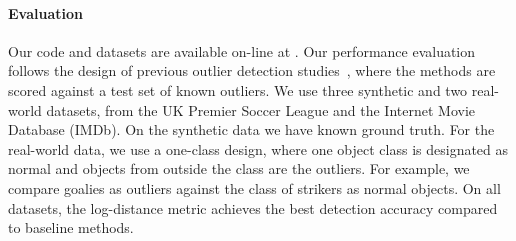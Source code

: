 \documentclass[conference]{IEEEtran}
\begin{document}
%
%
\paragraph{Evaluation} Our code and datasets are available on-line at \cite{url}.
Our performance evaluation follows the design of previous outlier detection studies~\cite{Gao2010,aggarwal2013},
where the methods are scored against a test set of known outliers.  
%
We use three synthetic and two real-world datasets, from the UK Premier Soccer League and the Internet Movie Database (IMDb). On the synthetic data we have known ground truth. For the real-world data, we use a one-class design, where one object class is designated as normal and objects from outside the class are the outliers. For example, we compare goalies as outliers against the class of strikers as normal objects. 
On all datasets, the log-distance metric achieves the best detection accuracy compared to baseline methods. 
\end{document}
